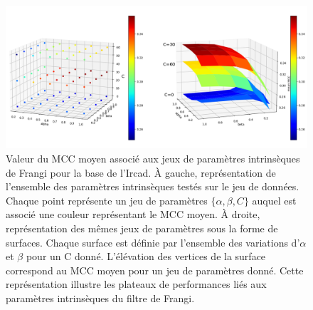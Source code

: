 \begin{figure}[!ht]
  \centering
  \includegraphics[width=\textwidth]{Images/frangi_params.png}
  \caption{Valeur du MCC moyen associé aux jeux de paramètres intrinsèques de Frangi pour la base de l'Ircad. À gauche, représentation de l'ensemble des paramètres intrinsèques testés sur le jeu de données. Chaque point représente un jeu de paramètres $\{\alpha,\beta, C\}$ auquel est associé une couleur représentant le MCC moyen. À droite, représentation des mêmes jeux de paramètres sous la forme de surfaces. Chaque surface est définie par l'ensemble des variations d'$\alpha$ et $\beta$ pour un C donné. L'élévation des vertices de la surface correspond au MCC moyen pour un jeu de paramètres donné. Cette représentation illustre les plateaux de performances liés aux paramètres intrinsèques du filtre de Frangi.}
  \label{fig:frangi_params}
\end{figure}

